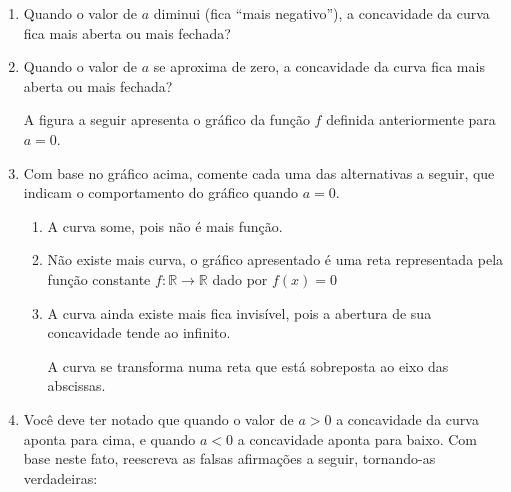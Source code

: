 \documentclass[10 pt,usenames,dvipsnames, oneside]{article}
\begin{document}
\begin{enumerate}
\item {} 
Quando o valor de \(a\) diminui (fica “mais negativo”), a concavidade da curva fica mais aberta ou mais fechada?

\item {} 
Quando o valor de \(a\) se aproxima de zero, a concavidade da curva fica mais aberta ou mais fechada?

A figura a seguir apresenta o gráfico da função \(f\) definida anteriormente para \(a=0\).
\begin{center}\end{center}
\item {} 
Com base no gráfico acima, comente cada uma das alternativas a seguir, que indicam o comportamento do gráfico quando \(a=0\).

\begin{enumerate}
\item A curva some, pois não é mais função.

\item Não existe mais curva, o gráfico apresentado é uma reta representada pela função constante \(f:\mathbb{R}\to\mathbb{R}\) dado por \(f(x)=0\)

\item A curva ainda existe mais fica invisível, pois a abertura de sua concavidade tende ao infinito.

A curva se transforma numa reta que está sobreposta ao eixo das abscissas.
\end{enumerate}

\item {} 
Você deve ter notado que quando o valor de \(a>0\) a concavidade da curva aponta para cima, e quando \(a<0\) a concavidade aponta para baixo. Com base neste fato, reescreva as falsas afirmações a seguir, tornando-as verdadeiras:


\end{enumerate}
\end{document}
